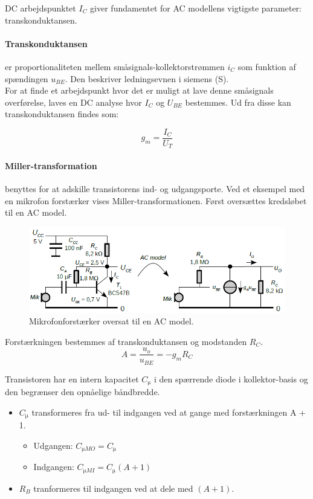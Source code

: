 \documentclass[danish]{article}
\begin{document}
DC arbejdspunktet $I_C$ giver fundamentet for AC modellens vigtigste parameter: transkonduktansen.

\paragraph{Transkonduktansen} er proportionaliteten mellem småsignals-kollektorstrømmen $i_C$ som funktion af spændingen $u_{BE}$. 
Den beskriver ledningsevnen i siemens (S).\\

For at finde et arbejdspunkt hvor det er muligt at lave denne småsignals overførelse, laves en DC analyse hvor $I_C$  og $U_{BE}$ bestemmes. Ud fra disse kan transkonduktansen findes som:

\begin{equation} 
g_m = \dfrac{I_C}{U_T}
\end{equation}

\newpage
\paragraph{Miller-transformation} benyttes for at adskille transistorens ind- og udgangsporte. Ved et eksempel med en mikrofon forstærker vises Miller-transformationen. Først oversættes kredsløbet til en AC model.
\begin{figure} [H]
	\centering
	\includegraphics[width=0.8\linewidth]{graphics/mikrofon}
	\caption{Mikrofonforstærker oversat til en AC model.}
	\label{fig:mikrofonforstærker}
\end{figure}

Forstærkningen bestemmes af transkonduktansen og modstanden $R_C$.
\begin{equation} 
A = \dfrac{u_o}{u_{BE}} = -g_m R_C
\end{equation}

Transistoren har en intern kapacitet $C_{\si{\micro}}$ i den spærrende diode i kollektor-basis og den begrænser den opnåelige båndbredde.

\begin{itemize}
	\item $C_{\si{\micro}}$ transformeres fra ud- til indgangen ved at gange med forstærkningen A + 1.
	\begin{itemize}
		\item Udgangen: $C_{\si{\micro}MO} = C_{\si{\micro}}$
		\item Indgangen: $C_{\si{\micro}MI} = C_{\si{\micro}}(A + 1)$
	\end{itemize}
	\item $R_B$ tranformeres til indgangen ved at dele med $(A + 1)$.
\end{itemize}
\end{document}
